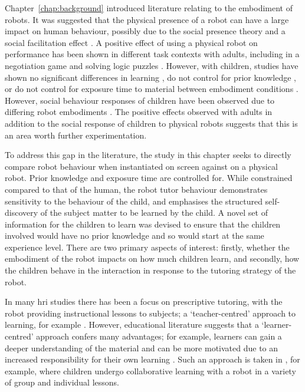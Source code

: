 Chapter~\ref{chap:background} introduced literature relating to the embodiment of robots. It was suggested that the physical presence of a robot can have a large impact on human behaviour, possibly due to the social presence theory \citep{biocca2003toward} and a social facilitation effect \citep{triplett1898dynamogenic,zajonc1965social}. A positive effect of using a physical robot on performance has been shown in different task contexts with adults, including in a negotiation game \citep{bartneck2003interacting} and solving logic puzzles \citep{leyzberg2012physical}. However, with children, studies have shown no significant differences in learning \citep{westlund2015comparison}, do not control for prior knowledge \citep{han2008comparative}, or do not control for exposure time to material between embodiment conditions \citep{hyun2008comparative}. However, social behaviour responses of children have been observed due to differing robot embodiments \cite{looije2012help}. The positive effects observed with adults in addition to the social response of children to physical robots suggests that this is an area worth further experimentation.

To address this gap in the literature, the study in this chapter seeks to directly compare robot behaviour when instantiated on screen against on a physical robot. Prior knowledge and exposure time are controlled for. While constrained compared to that of the human, the robot tutor behaviour demonstrates sensitivity to the behaviour of the child, and emphasises the structured self-discovery of the subject matter to be learned by the child. A novel set of information for the children to learn was devised to ensure that the children involved would have no prior knowledge and so would start at the same experience level. There are two primary aspects of interest: firstly, whether the embodiment of the robot impacts on how much children learn, and secondly, how the children behave in the interaction in response to the tutoring strategy of the robot.

In many \acrshort{hri} studies there has been a focus on prescriptive tutoring, with the robot providing instructional lessons to subjects; a `teacher-centred' approach to learning, for example \citet{leyzberg2014personalizing}. However, educational literature suggests that a `learner-centred' approach confers many advantages; for example, learners can gain a deeper understanding of the material and can be more motivated due to an increased responsibility for their own learning \citep{spencer1999learner}. Such an approach is taken in \cite{kanda2012children}, for example, where children undergo collaborative learning with a robot in a variety of group and individual lessons.

